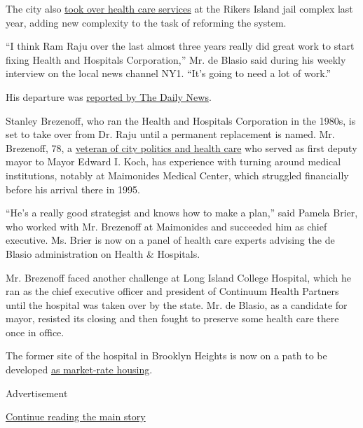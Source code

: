 The city also
\href{http://www.nytimes3xbfgragh.onion/2015/06/11/nyregion/report-details-failings-of-corizon-rikers-island-health-provider.html}{took
over health care services} at the Rikers Island jail complex last year,
adding new complexity to the task of reforming the system.

``I think Ram Raju over the last almost three years really did great
work to start fixing Health and Hospitals Corporation,'' Mr. de Blasio
said during his weekly interview on the local news channel NY1. ``It's
going to need a lot of work.''

His departure was
\href{http://www.nydailynews.com/new-york/head-nyc-cash-bleeding-public-hospital-system-step-article-1.2862844}{reported
by The Daily News}.

Stanley Brezenoff, who ran the Health and Hospitals Corporation in the
1980s, is set to take over from Dr. Raju until a permanent replacement
is named. Mr. Brezenoff, 78, a
\href{http://www.nytimes3xbfgragh.onion/1984/01/04/nyregion/man-in-the-news-a-public-official-who-garners-superlatives-stanley-brezenoff.html}{veteran
of city politics and health care} who served as first deputy mayor to
Mayor Edward I. Koch, has experience with turning around medical
institutions, notably at Maimonides Medical Center, which struggled
financially before his arrival there in 1995.

``He's a really good strategist and knows how to make a plan,'' said
Pamela Brier, who worked with Mr. Brezenoff at Maimonides and succeeded
him as chief executive. Ms. Brier is now on a panel of health care
experts advising the de Blasio administration on Health \& Hospitals.

Mr. Brezenoff faced another challenge at Long Island College Hospital,
which he ran as the chief executive officer and president of Continuum
Health Partners until the hospital was taken over by the state. Mr. de
Blasio, as a candidate for mayor, resisted its closing and then fought
to preserve some health care there once in office.

The former site of the hospital in Brooklyn Heights is now on a path to
be developed
\href{http://www.politico.com/states/new-york/city-hall/story/2016/11/in-disappointing-turn-for-de-blasio-long-island-college-hospital-will-not-include-affordable-housing-107092\#ixzz4P4CeuxXZ}{as
market-rate housing}.

Advertisement

\protect\hyperlink{after-bottom}{Continue reading the main story}

